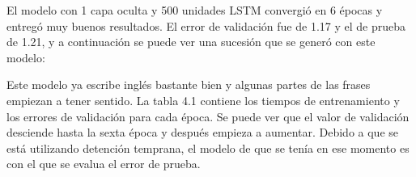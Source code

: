 \vspace{1em}

El modelo con 1 capa oculta y 500 unidades LSTM convergió en 6 épocas y entregó muy buenos resultados. El error de validación fue de 1.17 y el de prueba de 1.21, y a continuación se puede ver una sucesión que se generó con este modelo:

\vspace{1em}



\vspace{1em}

Este modelo ya escribe inglés bastante bien y algunas partes de las frases empiezan a tener sentido. La tabla 4.1 contiene los tiempos de entrenamiento y los errores de validación para cada época. Se puede ver que el valor de validación desciende hasta la sexta época y después empieza a aumentar. Debido a que se está utilizando detención temprana, el modelo de que se tenía en ese momento es con el que se evalua el error de prueba.

\vspace{1em}

